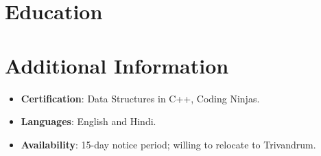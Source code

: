 \documentclass[11pt,a4paper,sans]{moderncv}
\begin{document}
\section{Education}
\vspace{1pt}


\section{Additional Information}
\vspace{1pt}
\begin{itemize}
\item {\textbf{Certification}: Data Structures in C++, Coding Ninjas.}
\item {\textbf{Languages}: English and Hindi.}
\item {\textbf{Availability}: 15-day notice period; willing to relocate to Trivandrum.}
\end{itemize}
\end{document}
